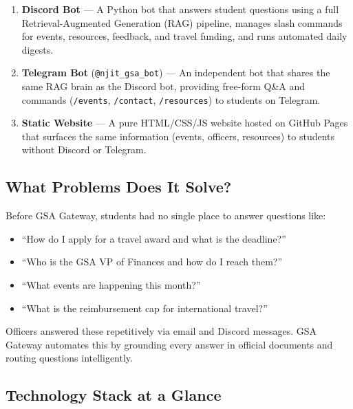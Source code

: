 \documentclass[12pt,letterpaper]{article}
\begin{document}
\begin{enumerate}[leftmargin=2em]
  \item \textbf{Discord Bot} — A Python bot that answers student questions using a
        full Retrieval-Augmented Generation (RAG) pipeline, manages slash commands for
        events, resources, feedback, and travel funding, and runs automated daily
        digests.
  \item \textbf{Telegram Bot} (\texttt{@njit\_gsa\_bot}) — An independent bot that
        shares the same RAG brain as the Discord bot, providing free-form Q\&A and
        commands (\texttt{/events}, \texttt{/contact}, \texttt{/resources}) to students
        on Telegram.
  \item \textbf{Static Website} — A pure HTML/CSS/JS website hosted on GitHub Pages
        that surfaces the same information (events, officers, resources) to students
        without Discord or Telegram.
\end{enumerate}

\subsection{What Problems Does It Solve?}

Before GSA Gateway, students had no single place to answer questions like:
\begin{itemize}[leftmargin=2em]
  \item ``How do I apply for a travel award and what is the deadline?''
  \item ``Who is the GSA VP of Finances and how do I reach them?''
  \item ``What events are happening this month?''
  \item ``What is the reimbursement cap for international travel?''
\end{itemize}

Officers answered these repetitively via email and Discord messages. GSA Gateway
automates this by grounding every answer in official documents and routing
questions intelligently.

\subsection{Technology Stack at a Glance}
\end{document}
